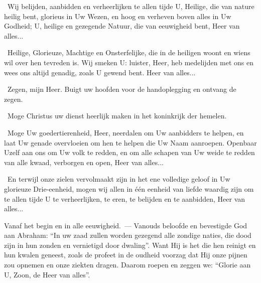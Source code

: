 \documentclass[12pt,twoside,a5paper]{article}
\begin{document}
\begin{halfparskip}
   \cc~Wij belijden, aanbidden en verheerlijken te allen tijde U, Heilige, die van nature heilig bent, glorieus in Uw Wezen, en hoog en verheven boven alles in Uw Godheid; U, heilige en gezegende Natuur, die van eeuwigheid bent, Heer van alles...
\end{halfparskip}

\begin{halfparskip}
   \cc~Heilige, Glorieuze, Machtige en Onsterfelijke, die in de heiligen woont en wiens wil over hen tevreden is. Wij smeken U: luister, Heer, heb medelijden met ons en wees ons altijd genadig, zoals U gewend bent. Heer van alles...
\end{halfparskip}

\begin{halfparskip}
   \dd~Zegen, mijn Heer. Buigt uw hoofden voor de handoplegging en ontvang de zegen.

  \cc~Moge Christus uw dienst heerlijk maken in het koninkrijk der hemelen.

\end{halfparskip}

\fullline
\begin{halfparskip}

   \cc~Moge Uw goedertierenheid, Heer, neerdalen om Uw aanbidders te helpen, en laat Uw  genade overvloeien om hen te helpen die Uw Naam aanroepen. Openbaar Uzelf aan ons om Uw volk te redden, en om alle schapen van Uw weide te redden van alle kwaad, verborgen en open, Heer van alles...

   \cc~En terwijl onze zielen vervolmaakt zijn in het ene volledige geloof in Uw glorieuze Drie-eenheid, mogen wij allen in één eenheid van liefde waardig zijn om te allen tijde U te verheerlijken, te eren, te belijden en te aanbidden, Heer van alles...
\end{halfparskip}



\begin{halfparskip}
   Vanaf het begin en in alle eeuwigheid.~--- Vanouds beloofde en bevestigde God aan Abraham: ``In uw zaad zullen worden gezegend alle zondige naties, die dood zijn in hun zonden en vernietigd door dwaling''. Want Hij is het die hen reinigt en hun kwalen geneest, zoals de profeet in de oudheid voorzag dat Hij onze pijnen zou opnemen en onze ziekten dragen. Daarom roepen en zeggen we: ``Glorie aan U, Zoon, de Heer van alles''.
\end{halfparskip}
\end{document}
